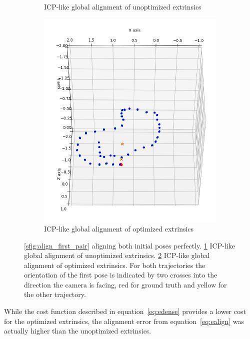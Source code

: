 \begin{figure}[ht]
\begin{subfigure}[b]{.32\textwidth}
                \caption{ICP-like global alignment of unoptimized extrinsics}
                \label{sfig:align_global}
            \end{subfigure}
            \begin{subfigure}[b]{.32\textwidth}
                \includegraphics[width=.95\textwidth]{images/align_global_opt}
                \caption{ICP-like global alignment of optimized extrinsics}
                \label{sfig:align_global_opt}
            \end{subfigure}
            \caption[]{\ref{sfig:align_first_pair} aligning both initial poses perfectly. \ref{sfig:align_global} ICP-like global alignment of unoptimized extrinsics. \ref{sfig:align_global_opt} ICP-like global alignment of optimized extrinsics. For both trajectories the orientation of the first pose is indicated by two crosses into the direction the camera is facing, red for ground truth and yellow for the other trajectory.}
            \label{fig:vis_perspective}
        \end{figure}
        While the cost function described in equation~\ref{eq:edense} provides a lower cost for the optimized extrinsics, the alignment error from equation~\ref{eq:ealign} was actually higher than the unoptimized extrinsics.
